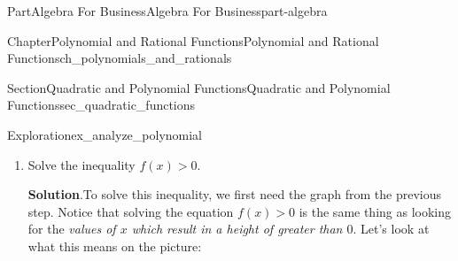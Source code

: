 \documentclass{tufte-book}
\newcommand{\blocktitlefont}{\relax}
\numberwithin{equation}{chapter}
\newcommand{\lt}{<}
\newcommand{\gt}{>}
\begin{document}
\begin{partptx}{Part}{Algebra For Business}{}{Algebra For Business}{}{}{part-algebra}
\begin{chapterptx}{Chapter}{Polynomial and Rational Functions}{}{Polynomial and Rational Functions}{}{}{ch_polynomials_and_rationals}
\begin{sectionptx}{Section}{Quadratic and Polynomial Functions}{}{Quadratic and Polynomial Functions}{}{}{sec_quadratic_functions}
\begin{exploration}{Exploration}{}{ex_analyze_polynomial}
\begin{enumerate}[font=\bfseries,label=(\alph*),ref=\alph*]
\par\smallskip%
\noindent\textbf{\blocktitlefont Solution}.\hypertarget{ex_analyze_polynomial-4-2}{}\quad{}Recall that the shape of a quadratic depends only on the coefficient \(a\)	of \(x^2\).  Because \(a=-1\lt 0\), the graph of the function is a parabola that opens down.%
\par
We have also already found the \(x\)-intercepts \(x=1\) and \(x=2\) and the vertex \((1.5,0.25)\).  Putting this all together we get the following picture:%
\begin{image}{0.125}{0.75}{0.125}{}%
%
\end{image}%
\item{}Solve the inequality \(f(x)>0\).%
\par\smallskip%
\noindent\textbf{\blocktitlefont Solution}.\hypertarget{ex_analyze_polynomial-5-2}{}\quad{}To solve this inequality, we first need the graph from the previous step.  Notice that solving the equation \(f(x)\gt 0\) is the same thing as looking for the \emph{values of \(x\) which result in a height of greater than \(0\)}. Let's look at what this means on the picture:%
\begin{image}{0.125}{0.75}{0.125}{}%
\end{image}
\end{enumerate}
\end{exploration}
\end{sectionptx}
\end{chapterptx}
\end{partptx}
\end{document}
